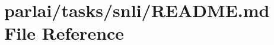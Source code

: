 \hypertarget{parlai_2tasks_2snli_2README_8md}{}\section{parlai/tasks/snli/\+R\+E\+A\+D\+ME.md File Reference}
\label{parlai_2tasks_2snli_2README_8md}
